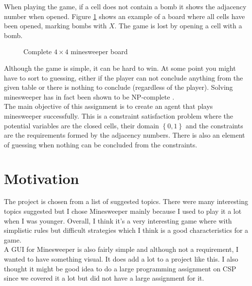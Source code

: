 \documentclass[11pt,a4paper,notitlepage]{article}
\newcommand{\set}[1]{\left\{#1\right\}} %
\theoremstyle{definition}
\begin{document}
When playing the game, if a cell does not contain a bomb it shows the adjacency number when opened. Figure \ref{fig:brdexamp} shows an example of a board where all cells have been opened, marking bombs with $X$. The game is lost by opening a cell with a bomb. 
\begin{figure}[H]
\begin{center}
\end{center}
\caption{Complete $4 \times 4$ minesweeper board}
\label{fig:brdexamp}
\end{figure}
Although the game is simple, it can be hard to win. At some point you might have to sort to guessing, either if the player can not conclude anything from the given table or there is nothing to conclude (regardless of the player). Solving minesweeper has in fact been shown to be NP-complete \cite{npc}.\\

The main objective of this assignment is to create an agent that plays minesweeper successfully. This is a constraint satisfaction problem where the potential variables are the closed cells, their domain $\set{0,1}$ and the constraints are the requirements formed by the adjacency numbers. There is also an element of guessing when nothing can be concluded from the constraints.

\section{Motivation}
The project is chosen from a list of suggested topics. There were many interesting topics suggested but I chose Minesweeper mainly because I used to play it a lot when I was younger. Overall, I think it's a very interesting game where with simplistic rules but difficult strategies which I think is a good characteristics for a game.\\

A GUI for Minesweeper is also fairly simple and although not a requirement, I wanted to have something visual. It does add a lot to a project like this. I also thought it might be good idea to do a large programming assignment on CSP since we covered it a lot but did not have a large assignment for it.
\end{document}

